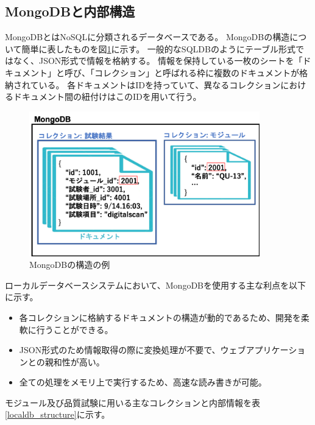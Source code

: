 \subsection{MongoDBと内部構造}
MongoDBとはNoSQLに分類されるデータベースである。
MongoDBの構造について簡単に表したものを図\ref{mongodb_schema}に示す。
一般的なSQLDBのようにテーブル形式ではなく、JSON形式で情報を格納する。
情報を保持している一枚のシートを「ドキュメント」と呼び、「コレクション」と呼ばれる枠に複数のドキュメントが格納されている。
各ドキュメントはIDを持っていて、異なるコレクションにおけるドキュメント間の紐付けはこのIDを用いて行う。

\begin{figure}[bpt]\centering
\includegraphics[width=10cm]{mongodb_schema}
\caption[MongoDBの構造の例]{MongoDBの構造の例}
\label{mongodb_schema}
\end{figure}

ローカルデータベースシステムにおいて、MongoDBを使用する主な利点を以下に示す。

\begin{itemize}
  \item 各コレクションに格納するドキュメントの構造が動的であるため、開発を柔軟に行うことができる。
  \item JSON形式のため情報取得の際に変換処理が不要で、ウェブアプリケーションとの親和性が高い。
  \item 全ての処理をメモリ上で実行するため、高速な読み書きが可能。
\end{itemize}

モジュール及び品質試験に用いる主なコレクションと内部情報を表\ref{localdb_structure}に示す。

